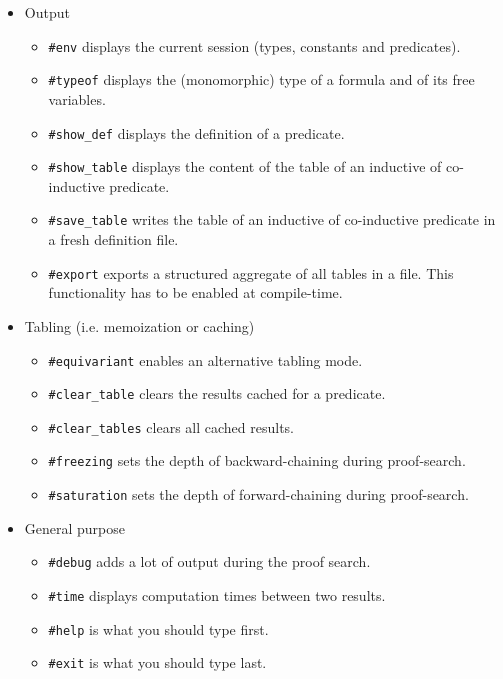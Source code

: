 \begin{itemize}
  \item Output
    \begin{itemize}
      \item \lstinline{#env} displays the current session (types,
        constants and predicates).

      \item \lstinline{#typeof} displays the (monomorphic) type of a
        formula and of its free variables.

      \item \lstinline{#show_def} displays the definition of a
        predicate.

      \item \lstinline{#show_table} displays the content of the table of
        an inductive of co-inductive predicate.

      \item \lstinline{#save_table} writes the table of an inductive of
        co-inductive predicate in a fresh definition file.

      \item \lstinline{#export} exports a structured aggregate of all
        tables in a file. This functionality has to be enabled at
        compile-time.
    \end{itemize}

  \item Tabling (i.e. memoization or caching)
    \begin{itemize}
      \item \lstinline{#equivariant} enables an alternative tabling
        mode.

      \item \lstinline{#clear_table} clears the results cached for a
        predicate.

      \item \lstinline{#clear_tables} clears all cached results.

      \item \lstinline{#freezing} sets the depth of backward-chaining
        during proof-search.

      \item \lstinline{#saturation} sets the depth of forward-chaining
        during proof-search.
    \end{itemize}

  \item General purpose
    \begin{itemize}
      \item \lstinline{#debug} adds a lot of output during the proof
        search.

      \item \lstinline{#time} displays computation times between two
        results.

      \item \lstinline{#help} is what you should type first.

      \item \lstinline{#exit} is what you should type last.
    \end{itemize}
\end{itemize}
